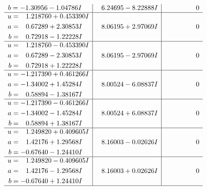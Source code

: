 \documentclass[1p]{elsarticle_modified}
\theoremstyle{definition}
\begin{document}
$$\begin{array}{c|c|c}
\begin{aligned}
b &= -1.30956 - 1.04786 I\end{aligned}
 & \phantom{-}6.24695 - 8.22888 I & \phantom{-0.000000 } 0 \\ \hline\begin{aligned}
u &= \phantom{-}1.218760 + 0.453390 I \\
a &= \phantom{-}0.67289 + 2.30853 I \\
b &= \phantom{-}0.72918 - 1.22228 I\end{aligned}
 & \phantom{-}8.06195 + 2.97069 I & \phantom{-0.000000 } 0 \\ \hline\begin{aligned}
u &= \phantom{-}1.218760 - 0.453390 I \\
a &= \phantom{-}0.67289 - 2.30853 I \\
b &= \phantom{-}0.72918 + 1.22228 I\end{aligned}
 & \phantom{-}8.06195 - 2.97069 I & \phantom{-0.000000 } 0 \\ \hline\begin{aligned}
u &= -1.217390 + 0.461266 I \\
a &= -1.34002 + 1.45284 I \\
b &= \phantom{-}0.58894 - 1.38167 I\end{aligned}
 & \phantom{-}8.00524 - 6.08837 I & \phantom{-0.000000 } 0 \\ \hline\begin{aligned}
u &= -1.217390 - 0.461266 I \\
a &= -1.34002 - 1.45284 I \\
b &= \phantom{-}0.58894 + 1.38167 I\end{aligned}
 & \phantom{-}8.00524 + 6.08837 I & \phantom{-0.000000 } 0 \\ \hline\begin{aligned}
u &= \phantom{-}1.249820 + 0.409605 I \\
a &= \phantom{-}1.42176 + 1.29568 I \\
b &= -0.67640 - 1.24410 I\end{aligned}
 & \phantom{-}8.16003 - 0.02626 I & \phantom{-0.000000 } 0 \\ \hline\begin{aligned}
u &= \phantom{-}1.249820 - 0.409605 I \\
a &= \phantom{-}1.42176 - 1.29568 I \\
b &= -0.67640 + 1.24410 I\end{aligned}
 & \phantom{-}8.16003 + 0.02626 I & \phantom{-0.000000 } 0\\
 \hline 

\end{array}$$
\end{document}

